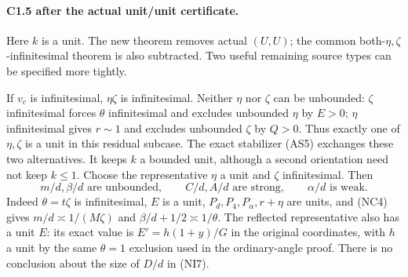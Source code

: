 \paragraph{C1.5 after the actual unit/unit certificate.}
Here $k$ is a unit. The new theorem removes actual $(U,U)$; the
common both-$\eta,\zeta$-infinitesimal theorem is also subtracted.
Two useful remaining source types can be specified more tightly.

If $v_c$ is infinitesimal, $\eta\zeta$ is infinitesimal. Neither
$\eta$ nor $\zeta$ can be unbounded: $\zeta$ infinitesimal forces
$\theta$ infinitesimal and excludes unbounded $\eta$ by $E>0$;
$\eta$ infinitesimal gives $r\sim1$ and excludes unbounded $\zeta$
by $Q>0$. Thus exactly one of $\eta,\zeta$ is a unit in this residual
subcase. The exact stabilizer (AS5) exchanges these two alternatives.
It keeps $k$ a bounded unit, although a second orientation need not
keep $k\le1$. Choose the representative $\eta$ a unit and
$\zeta$ infinitesimal. Then
\[
 m/d,\beta/d\text{ are unbounded},\qquad
 C/d,A/d\text{ are strong},\qquad \alpha/d\text{ is weak}.
 \tag{NI7}
\]
Indeed $\theta=t\zeta$ is infinitesimal, $E$ is a unit,
$P_d,P_4,P_\alpha,r+\eta$ are units, and (NC4) gives
$m/d\asymp1/(M\zeta)$ and $\beta/d+1/2\asymp1/\theta$.
The reflected representative also has a unit $E$: its exact value
is $E'=h(1+y)/G$ in the original coordinates, with $h$ a unit by
the same $\theta=1$ exclusion used in the ordinary-angle proof.
There is no conclusion about the size of $D/d$ in (NI7).

